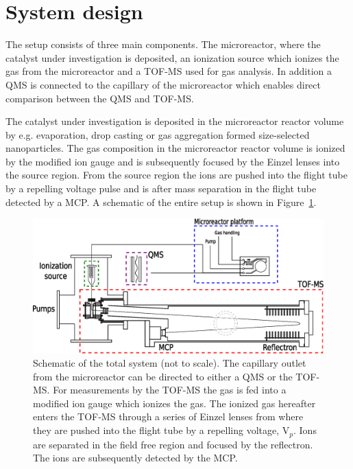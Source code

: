 \documentclass[aip,rsi]{revtex4-1}
\begin{document}
\section{System design}
The setup consists of three main components. The microreactor, where the catalyst under investigation is deposited, an ionization source which ionizes the gas from the microreactor and a TOF-MS used for gas analysis. In addition a QMS is connected to the capillary of the microreactor which enables direct comparison between the QMS and TOF-MS.

The catalyst under investigation is deposited in the microreactor reactor volume by e.g. evaporation\cite{Henriksen2009}, drop casting\cite{Vesborg2010} or gas aggregation formed size-selected nanoparticles. The gas composition in the microreactor reactor volume is ionized by the modified ion gauge  and is subsequently focused by the Einzel lenses into the source region. From the source region the ions are pushed into the flight tube by a repelling voltage pulse and is after mass separation in the flight tube detected by a MCP. A schematic of the entire setup is shown in Figure~\ref{fig:TOF_microreactor}.
\begin{figure}
 \includegraphics[width=17cm]{TOF_microreactor.eps}
 \caption{Schematic of the total system (not to scale). The capillary outlet from the microreactor can be directed to either a QMS or the TOF-MS. For measurements by the TOF-MS the gas is fed into a modified ion gauge which ionizes the gas. The ionized gas hereafter enters the TOF-MS through a series of Einzel lenses from where they are pushed into the flight tube by a repelling voltage, V$_p$. Ions are separated in the field free region and focused by the reflectron. The ions are subsequently detected by the MCP.\label{fig:TOF_microreactor}}
\end{figure}
\end{document}
